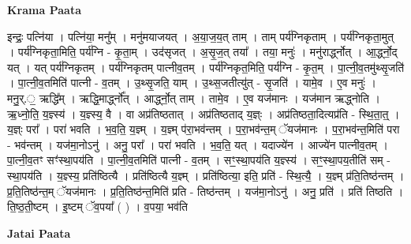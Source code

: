 \documentclass[17pt]{extarticle}
\begin{document}
\textbf{Krama Paata} \newline

इन्द्रः॒ पत्नि॑या । पत्नि॑या॒ मनु᳚म् । मनु॑मयाजयत् । अ॒या॒ज॒य॒त् ताम् । ताम् पर्य॑ग्निकृताम् । पर्य॑ग्निकृता॒मुत् । पर्य॑ग्निकृता॒मिति॒ पर्य॑ग्नि - कृ॒ता॒म् । उद॑सृजत् । अ॒सृ॒ज॒त् तया᳚ । तया॒ मनुः॑ । मनु॑रार्द्ध्नोत् । आ॒र्द्ध्नो॒द् यत् । यत् पर्य॑ग्निकृतम् । पर्य॑ग्निकृतम् पात्नीव॒तम् । पर्य॑ग्निकृत॒मिति॒ पर्य॑ग्नि - कृ॒त॒म् । पा॒त्नी॒व॒तमु॑थ्सृ॒जति॑ । पा॒त्नी॒व॒तमिति॑ पात्नी - व॒तम् । उ॒थ्सृ॒जति॒ याम् । उ॒थ्स॒जतीत्यु॑त् - सृ॒जति॑ । यामे॒व । ए॒व मनुः॑ । मनु॒र्.॒ ऋद्धि᳚म् । ऋद्धि॒मार्द्ध्नो᳚त् । आर्द्ध्नो॒त् ताम् । तामे॒व । ए॒व यज॑मानः । यज॑मान ऋद्ध्नोति । ऋ॒ध्नो॒ति॒ य॒ज्ञ्स्य॑ । य॒ज्ञ्स्य॒ वै । वा अप्र॑तिष्ठतात् । अप्र॑तिष्ठताद् य॒ज्ञ्ः । अप्र॑तिष्ठता॒दित्यप्र॑ति - स्थि॒ता॒त्॒ । य॒ज्ञ्ः परा᳚ । परा॑ भवति । भ॒व॒ति॒ य॒ज्ञ्म् । य॒ज्ञ्म् प॑रा॒भव॑न्तम् । प॒रा॒भव॑न्त॒म् ॅयज॑मानः । प॒रा॒भव॑न्त॒मिति॑ परा - भव॑न्तम् । यज॑मा॒नोऽनु॑ । अनु॒ परा᳚ । परा॑ भवति । भ॒व॒ति॒ यत् । यदाज्ये॑न । आज्ये॑न पात्नीव॒तम् । पा॒त्नी॒व॒तꣳ सꣳ॑स्था॒पय॑ति । पा॒त्नी॒व॒तमिति॑ पात्नी - व॒तम् । सꣳ॒॒स्था॒पय॑ति य॒ज्ञ्स्य॑ । सꣳ॒॒स्था॒पय॒तीति॑ सम् - स्था॒पय॑ति । य॒ज्ञ्स्य॒ प्रति॑ष्ठित्यै । प्रति॑ष्ठित्यै य॒ज्ञ्म् । प्रति॑ष्ठित्या॒ इति॒ प्रति॑ - स्थि॒त्यै॒ । य॒ज्ञ्म् प्र॑ति॒तिष्ठ॑न्तम् । प्र॒ति॒तिष्ठ॑न्त॒म् ॅयज॑मानः । प्र॒ति॒तिष्ठ॑न्त॒मिति॑ प्रति - तिष्ठ॑न्तम् । यज॑मा॒नोऽनु॑ । अनु॒ प्रति॑ । प्रति॑ तिष्ठति । ति॒ष्ठ॒ती॒ष्टम् । इ॒ष्टम् ॅव॒पया᳚ ( ) । व॒पया॒ भव॑ति \newline

\textbf{Jatai Paata} \newline
\end{document}
